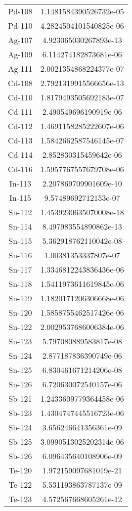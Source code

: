 \begin{table}[h!]
\begin{tabular}{|| c || c |}
Pd-108 &  1.1481584390526732e-05 \\
Pd-110 &  4.2824504101540825e-06 \\
Ag-107 &  4.923065030267893e-13 \\
Ag-109 &  6.114274182873681e-06 \\
Ag-111 &  2.0021354868224377e-07 \\
Cd-108 &  2.7921319915566656e-13 \\
Cd-110 &  1.8179493505692183e-07 \\
Cd-111 &  2.490549696190919e-06 \\
Cd-112 &  1.4691158285222607e-06 \\
Cd-113 &  1.5842662587546145e-07 \\
Cd-114 &  2.852830315459642e-06 \\
Cd-116 &  1.5957767557679708e-06 \\
In-113 &  2.207869709901609e-10 \\
In-115 &  9.57489692712153e-07 \\
Sn-112 &  1.4539230635070008e-18 \\
Sn-114 &  8.497983554890862e-13 \\
Sn-115 &  5.362918762110042e-08 \\
Sn-116 &  1.00381353337807e-07 \\
Sn-117 &  1.3346812243836436e-06 \\
Sn-118 &  1.5411973611619845e-06 \\
Sn-119 &  1.1820171206306668e-06 \\
Sn-120 &  1.5858755462517426e-06 \\
Sn-122 &  2.0029537686006384e-06 \\
Sn-123 &  5.797080889583817e-08 \\
Sn-124 &  2.877187836390749e-06 \\
Sn-125 &  6.830461671214206e-08 \\
Sn-126 &  6.720630072540157e-06 \\
Sb-121 &  1.2433609779364458e-06 \\
Sb-123 &  1.4304747445516723e-06 \\
Sb-124 &  3.656246641356361e-09 \\
Sb-125 &  3.0990513025202314e-06 \\
Sb-126 &  6.096435640108906e-09 \\
Te-120 &  1.972159097681019e-21 \\
Te-122 &  5.531193863787137e-09 \\
Te-123 &  4.572567668605261e-12 \\

\end{tabular}
\end{table}

